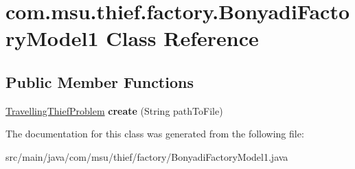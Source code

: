 \hypertarget{classcom_1_1msu_1_1thief_1_1factory_1_1BonyadiFactoryModel1}{\section{com.\-msu.\-thief.\-factory.\-Bonyadi\-Factory\-Model1 Class Reference}
\label{classcom_1_1msu_1_1thief_1_1factory_1_1BonyadiFactoryModel1}
}
\subsection*{Public Member Functions}
\begin{DoxyCompactItemize}
\item 
\hypertarget{classcom_1_1msu_1_1thief_1_1factory_1_1BonyadiFactoryModel1_a8d1d4c79661995bcf2b4a38dd0b700d0}{\hyperlink{classcom_1_1msu_1_1thief_1_1problems_1_1TravellingThiefProblem}{Travelling\-Thief\-Problem} {\bfseries create} (String path\-To\-File)}\label{classcom_1_1msu_1_1thief_1_1factory_1_1BonyadiFactoryModel1_a8d1d4c79661995bcf2b4a38dd0b700d0}

\end{DoxyCompactItemize}


The documentation for this class was generated from the following file\-:\begin{DoxyCompactItemize}
\item 
src/main/java/com/msu/thief/factory/Bonyadi\-Factory\-Model1.\-java\end{DoxyCompactItemize}
